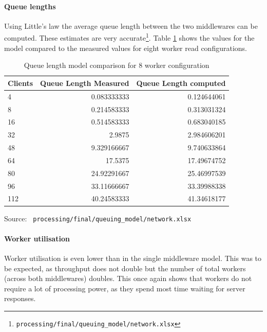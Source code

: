 \documentclass[11pt,a4paper]{article}
\newcommand{\source}[1]{\vspace{-1em}\caption*{\tiny{Source: \texttt{ {#1} }}} }
\begin{document}
\paragraph{Queue lengths}
Using Little's law the average queue length between the two middlewares can be computed. These estimates are very accurate\footnote{\label{source::q_network}\texttt{processing/final/queuing_model/network.xlsx}}. Table \ref{talbe::ql_comparison} shows the values for the model compared to the measured values for eight worker read configurations.
\begin{table}
    \centering
    \begin{tabular}{|l|r|r|}
        \hline\multicolumn{1}{|c|}{\textbf{Clients}} & \multicolumn{1}{|c|}{\textbf{Queue Length Measured}} & \multicolumn{1}{|c|}{\textbf{Queue Length computed}} \\
        \hline\hline 4 & 0.083333333 & 0.124644061 \\
        \hline 8 & 0.214583333 & 0.313031324 \\
        \hline 16 & 0.514583333 & 0.683040185 \\
        \hline 32 & 2.9875 & 2.984606201 \\
        \hline 48 & 9.329166667 & 9.740633864 \\
        \hline 64 & 17.5375 & 17.49674752 \\
        \hline 80 & 24.92291667 & 25.46997539 \\
        \hline 96 & 33.11666667 & 33.39988338 \\
        \hline 112 & 40.24583333 & 41.34618177 \\
        \hline
    \end{tabular}
    \caption{Queue length model comparison for 8 worker configuration}
    \source{processing/final/queuing\_model/network.xlsx}
    \label{talbe::ql_comparison}
\end{table}

\paragraph{Worker utilisation}
Worker utilisation is even lower than in the single middleware model. This was to be expected, as throughput does not double but the number of total workers (across both middlewares) doubles. This once again shows that workers do not require a lot of processing power, as they spend most time waiting for server responses.
\end{document}
